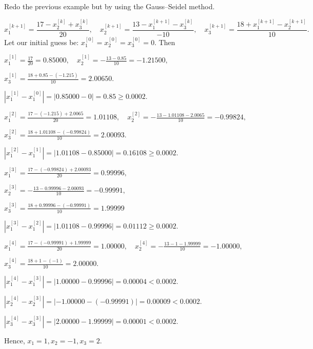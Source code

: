 \begin{example}
Redo the previous example but by using the Gauss--Seidel method.
\end{example}

\begin{solution}[6.5cm]
\[
 x_1^{[k+1]}=\frac{17-x_2^{[k]}+x_3^{[k]}}{20},
 \quad
 x_2^{[k+1]}=\frac{13-x_1^{[k+1]}-x_3^{[k]}}{-10},
 \quad
 x_3^{[k+1]}=\frac{18+x_1^{[k+1]}-x_2^{[k+1]}}{10}.
\]
Let our initial guess be: $x_1^{[0]}=x_2^{[0]}=x_3^{[0]}=0$. Then

\smallskip
\(\displaystyle
x_1^{[1]}=\frac{17}{20}=0.85000, \quad x_2^{[1]}=-\frac{13-0.85}{10}=-1.21500, \)

\smallskip
\(\displaystyle x_3^{[1]}=\frac{18+0.85-(-1.215)}{10}=2.00650.\)

\smallskip
\(
|x_1^{[1]} - x_1^{[0]}| = |0.85000-0| = 0.85 \geq 0.0002.
\)

\bigskip
\(\displaystyle
x_1^{[2]}=\frac{17-(-1.215)+2.0065}{20}=1.01108, \quad x_2^{[2]}=-\frac{13-1.01108-2.0065}{10}=-0.99824,\)

\smallskip
\(\displaystyle x_3^{[2]}=\frac{18+1.01108-(-0.99824)}{10}=2.00093.
\)

\smallskip\(
|x_1^{[2]} - x_1^{[1]}| = |1.01108-0.85000| = 0.16108 \geq 0.0002.
\)

\bigskip
\(\displaystyle
x_1^{[3]}=\frac{17-(-0.99824)+2.00093}{20}=0.99996, \)

\smallskip
\(\displaystyle x_2^{[3]}=-\frac{13-0.99996-2.00093}{10}=-0.99991,\)

\smallskip
\(\displaystyle x_3^{[3]}=\frac{18+0.99996-(-0.99991)}{10}=1.99999
\)

\smallskip\(
|x_1^{[3]} - x_1^{[2]}| = |1.01108-0.99996| = 0.01112 \geq 0.0002.
\)

\bigskip
\(\displaystyle
x_1^{[4]}=\frac{17-(-0.99991)+1.99999}{20}=1.00000, \quad x_2^{[4]}=-\frac{13-1-1.99999}{10}=-1.00000,\)

\smallskip
\(\displaystyle x_3^{[4]}=\frac{18+1-(-1)}{10}=2.00000.
\)

\smallskip\(
|x_1^{[4]} - x_1^{[3]}| = |1.00000-0.99996| = 0.00004 < 0.0002.
\)

\smallskip\(
|x_2^{[4]} - x_2^{[3]}| = |-1.00000-(-0.99991)| = 0.00009 < 0.0002.
\)

\smallskip\(
|x_3^{[4]} - x_3^{[3]}| = |2.00000-1.99999| = 0.00001 < 0.0002.
\)

\medskip \noindent
Hence, $x_1 = 1, x_2 = -1, x_3 = 2$.
\end{solution}

